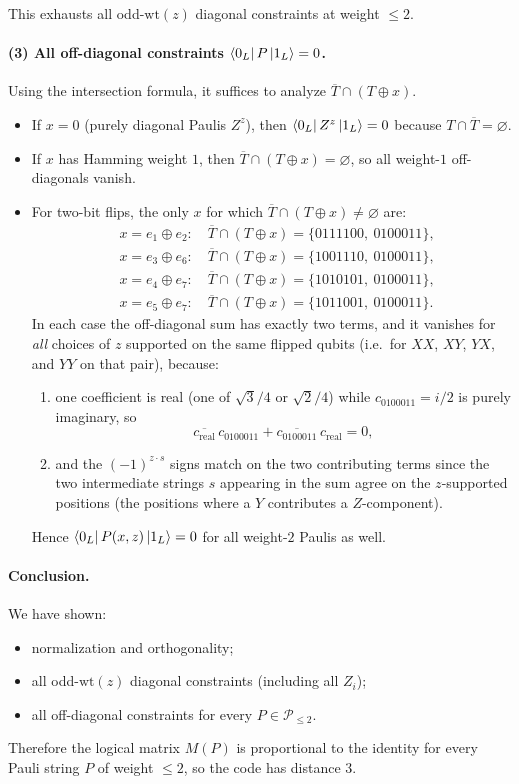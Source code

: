 \documentclass[11pt]{article}
\begin{document}
This exhausts all odd-$\mathrm{wt}(z)$ diagonal constraints at weight $\le 2$.

\paragraph{(3) All off-diagonal constraints $\bra{0_L}P\ket{1_L}=0$.}
Using the intersection formula, it suffices to analyze $\overline{T}\cap (T\oplus x)$.

\begin{itemize}
\item If $x=0$ (purely diagonal Paulis $Z^z$), then $\bra{0_L}Z^z\ket{1_L}=0$ because $T\cap\overline{T}=\varnothing$.
\item If $x$ has Hamming weight $1$, then $\overline{T}\cap(T\oplus x)=\varnothing$, so all weight-$1$ off-diagonals vanish.
\item For two-bit flips, the only $x$ for which $\overline{T}\cap(T\oplus x)\neq\varnothing$ are:
\[
\begin{aligned}
&x=e_1\oplus e_2:\quad \overline{T}\cap (T\oplus x)=\{0111100,\ 0100011\},\\
&x=e_3\oplus e_6:\quad \overline{T}\cap (T\oplus x)=\{1001110,\ 0100011\},\\
&x=e_4\oplus e_7:\quad \overline{T}\cap (T\oplus x)=\{1010101,\ 0100011\},\\
&x=e_5\oplus e_7:\quad \overline{T}\cap (T\oplus x)=\{1011001,\ 0100011\}.
\end{aligned}
\]
In each case the off-diagonal sum has exactly two terms, and it vanishes for \emph{all} choices of $z$ supported
on the same flipped qubits (i.e.\ for $X\!X$, $X\!Y$, $Y\!X$, and $Y\!Y$ on that pair), because:
\begin{enumerate}
\item one coefficient is real (one of $\sqrt3/4$ or $\sqrt2/4$) while $c_{0100011}=i/2$ is purely imaginary, so
\[
\overline{c_{\mathrm{real}}}\,c_{0100011}+\overline{c_{0100011}}\,c_{\mathrm{real}}=0,
\]
\item and the $(-1)^{z\cdot s}$ signs match on the two contributing terms since the two intermediate strings
$s$ appearing in the sum agree on the $z$-supported positions (the positions where a $Y$ contributes a $Z$-component).
\end{enumerate}
Hence $\bra{0_L}P(x,z)\ket{1_L}=0$ for all weight-$2$ Paulis as well.
\end{itemize}

\paragraph{Conclusion.}
We have shown:
\begin{itemize}
\item normalization and orthogonality;
\item all odd-$\mathrm{wt}(z)$ diagonal constraints (including all $Z_i$);
\item all off-diagonal constraints for every $P\in\mathcal{P}_{\le 2}$.
\end{itemize}
Therefore the logical matrix $M(P)$ is proportional to the identity for every Pauli string $P$ of weight $\le 2$,
so the code has distance $3$.
\end{document}
